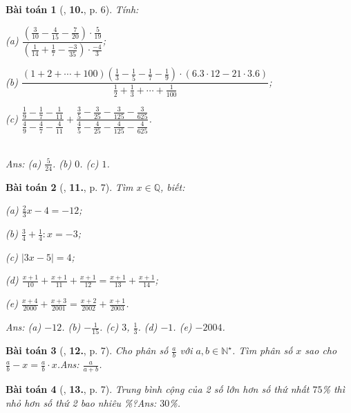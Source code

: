 \documentclass{article}
\numberwithin{equation}{section}
\newtheorem{baitoan}{Bài toán}
\begin{document}
\begin{baitoan}[\cite{Binh_Toan_7_tap_1},  \textbf{10.}, p. 6]
	Tính:\\
	\begin{enumerate*}
		\item[(a)] $\dfrac{\left(\frac{3}{10} - \frac{4}{15} - \frac{7}{20}\right)\cdot\frac{5}{19}}{\left(\frac{1}{14} + \frac{1}{7} - \frac{-3}{35}\right)\cdot\frac{-4}{3}}$;
		\item[(b)] $\dfrac{(1 + 2 + \cdots + 100)\left(\frac{1}{3} - \frac{1}{5} - \frac{1}{7} - \frac{1}{9}\right)\cdot(6.3\cdot 12 - 21\cdot 3.6)}{\frac{1}{2} + \frac{1}{3} + \cdots + \frac{1}{100}}$;
		\item[(c)] $\dfrac{\frac{1}{9} - \frac{1}{7} - \frac{1}{11}}{\frac{4}{9} - \frac{4}{7} - \frac{4}{11}} + \dfrac{\frac{3}{5} - \frac{3}{25} - \frac{3}{125} - \frac{3}{625}}{\frac{4}{5} - \frac{4}{25} - \frac{4}{125} - \frac{4}{625}}$.
	\end{enumerate*}\\\mbox{}\hfill\textsf{Ans:} (a) $\frac{5}{24}$. (b) $0$. (c) $1$.
\end{baitoan}

\begin{baitoan}[\cite{Binh_Toan_7_tap_1}, \textbf{11.}, p. 7]
	Tìm $x\in\mathbb{Q}$, biết:
	\begin{enumerate*}
		\item[(a)] $\frac{2}{3}x - 4 = -12$;
		\item[(b)] $\frac{3}{4} + \frac{1}{4}:x = -3$;
		\item[(c)] $|3x - 5| = 4$;
		\item[(d)] $\frac{x + 1}{10} + \frac{x + 1}{11} + \frac{x + 1}{12} = \frac{x + 1}{13} + \frac{x + 1}{14}$;
		\item[(e)] $\frac{x + 4}{2000} + \frac{x + 3}{2001} = \frac{x + 2}{2002} + \frac{x + 1}{2003}$.
	\end{enumerate*}\hfill\textsf{Ans:} (a) $-12$. (b) $-\frac{1}{15}$. (c) $3$, $\frac{1}{3}$. (d) $-1$. (e) $-2004$.
\end{baitoan}

\begin{baitoan}[\cite{Binh_Toan_7_tap_1}, \textbf{12.}, p. 7]
	Cho phân số $\frac{a}{b}$ với $a,b\in\mathbb{N}^\star$. Tìm phân số $x$ sao cho $\frac{a}{b} - x = \frac{a}{b}\cdot x$.\hfill\textsf{Ans:} $\frac{a}{a + b}$.
\end{baitoan}

\begin{baitoan}[\cite{Binh_Toan_7_tap_1}, \textbf{13.}, p. 7]
	Trung bình cộng của 2 số lớn hơn số thứ nhất $75$\% thì nhỏ hơn số thứ 2 bao nhiêu \%?\hfill\textsf{Ans:} $30$\%.
\end{baitoan}
\end{document}

